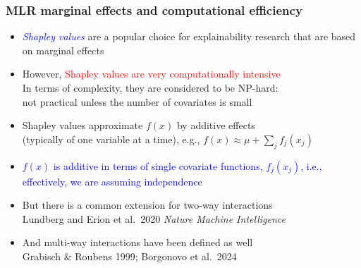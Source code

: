 \documentclass[11pt,dvipsnames,usenames,times]{beamer}
\newcommand*{\red}[1]{\textcolor{red}{#1}}%
\newcommand*{\blue}[1]{\textcolor{blue}{#1}}%
\begin{document}
\begin{comment}
\begin{frame}\frametitle{Marginal effect of age: 
HBART predictions for \textcolor{red}{F}\\
Direct Imputation Marginal: \bf{hbart} \tt{demo/height} }
\begin{center}
\texttt{[image: F-growth.pdf]}
\end{center}
\end{frame}

\begin{frame}\frametitle{Marginal effect of age: 
HBART vs.\ CDC for \textcolor{blue}{M}\\%
Direct Imputation Marginal: \bf{hbart} \tt{demo/height}}
\begin{center}
\texttt{[image: M-CDC.pdf]}
\end{center}
\end{frame}

\begin{frame}\frametitle{Marginal effect of age: 
HBART vs.\ CDC for \textcolor{red}{F}\\
Direct Imputation Marginal: \bf{hbart} \tt{demo/height}}
\begin{center}
\texttt{[image: F-CDC.pdf]}
\end{center}
\end{frame}
\end{comment}

\begin{frame}\frametitle{ MLR marginal effects and computational efficiency }
\begin{itemize}

\item \blue{\it Shapley values} are a popular choice for explainability
research that are based on marginal effects
\item However, \red{Shapley values are very computationally intensive}\\
In terms of complexity, they are considered to be NP-hard:\\
 not practical unless the number of covariates is small
\item Shapley values approximate $f(x)$ by additive effects\\ 
(typically of one variable at a time), e.g., $f(x) \approx \mu+ \sum_j f_j(x_j)$
\item \blue{$f(x)$ is additive in terms of single covariate functions,
$f_j(x_j)$, i.e., effectively, we are assuming independence} 
\item But there is a common extension for two-way interactions \\
Lundberg and Erion et al.\ 2020 {\it Nature Machine Intelligence}
\item And multi-way interactions have been defined as well\\
Grabisch \& Roubens 1999; Borgonovo et al.\ 2024
\end{itemize}
\end{frame}
\end{document}

